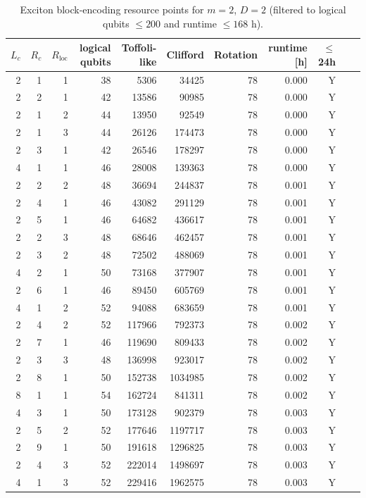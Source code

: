 \begin{table}[t]
\centering
\scriptsize
\caption{Exciton block-encoding resource points for $m=2$, $D=2$ (filtered to logical qubits $\leq 200$ and runtime $\leq 168$ h).}
\begin{tabularx}{\linewidth}{rrrrrrrrrrr}
\toprule
$L_c$ & $R_c$ & $R_{\mathrm{loc}}$ & logical qubits & Toffoli-like & Clifford & Rotation & runtime [h] & $\leq$ 24h \\
\midrule
2 & 1 & 1 & 38 & 5306 & 34425 & 78 & 0.000 & Y \\
2 & 2 & 1 & 42 & 13586 & 90985 & 78 & 0.000 & Y \\
2 & 1 & 2 & 44 & 13950 & 92549 & 78 & 0.000 & Y \\
2 & 1 & 3 & 44 & 26126 & 174473 & 78 & 0.000 & Y \\
2 & 3 & 1 & 42 & 26546 & 178297 & 78 & 0.000 & Y \\
4 & 1 & 1 & 46 & 28008 & 139363 & 78 & 0.000 & Y \\
2 & 2 & 2 & 48 & 36694 & 244837 & 78 & 0.001 & Y \\
2 & 4 & 1 & 46 & 43082 & 291129 & 78 & 0.001 & Y \\
2 & 5 & 1 & 46 & 64682 & 436617 & 78 & 0.001 & Y \\
2 & 2 & 3 & 48 & 68646 & 462457 & 78 & 0.001 & Y \\
2 & 3 & 2 & 48 & 72502 & 488069 & 78 & 0.001 & Y \\
4 & 2 & 1 & 50 & 73168 & 377907 & 78 & 0.001 & Y \\
2 & 6 & 1 & 46 & 89450 & 605769 & 78 & 0.001 & Y \\
4 & 1 & 2 & 52 & 94088 & 683659 & 78 & 0.001 & Y \\
2 & 4 & 2 & 52 & 117966 & 792373 & 78 & 0.002 & Y \\
2 & 7 & 1 & 46 & 119690 & 809433 & 78 & 0.002 & Y \\
2 & 3 & 3 & 48 & 136998 & 923017 & 78 & 0.002 & Y \\
2 & 8 & 1 & 50 & 152738 & 1034985 & 78 & 0.002 & Y \\
8 & 1 & 1 & 54 & 162724 & 841311 & 78 & 0.002 & Y \\
4 & 3 & 1 & 50 & 173128 & 902379 & 78 & 0.003 & Y \\
2 & 5 & 2 & 52 & 177646 & 1197717 & 78 & 0.003 & Y \\
2 & 9 & 1 & 50 & 191618 & 1296825 & 78 & 0.003 & Y \\
2 & 4 & 3 & 52 & 222014 & 1498697 & 78 & 0.003 & Y \\
4 & 1 & 3 & 52 & 229416 & 1962575 & 78 & 0.003 & Y \\

\end{tabularx}
\end{table}

